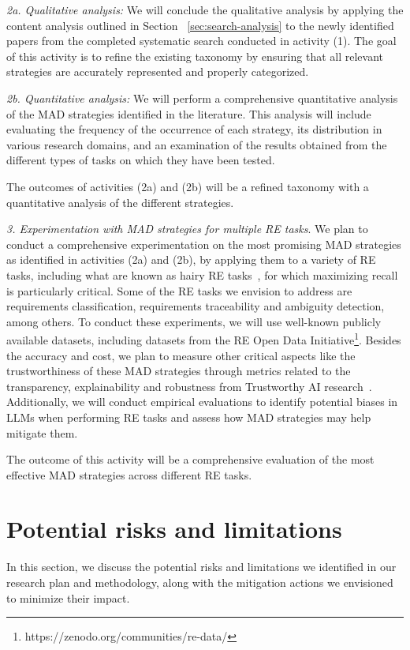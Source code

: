 \documentclass[conference]{IEEEtran}
\begin{document}
\textit{2a. Qualitative analysis: } We will conclude the qualitative analysis by applying the content analysis outlined in Section ~\ref{sec:search-analysis} to the newly identified papers from the completed systematic search conducted in activity (1). The goal of this activity is to refine the existing taxonomy by ensuring that all relevant strategies are accurately represented and properly categorized.

\textit{2b. Quantitative analysis: } We will perform a comprehensive quantitative analysis of the MAD strategies identified in the literature. This analysis will include evaluating the frequency of the occurrence of each strategy, its distribution in various research domains, and an examination of the results obtained from the different types of tasks on which they have been tested.

The outcomes of activities (2a) and (2b) will be a refined taxonomy with a quantitative analysis of the different strategies.

\textit{3. Experimentation with MAD strategies for multiple RE tasks}. We plan to conduct a comprehensive experimentation on the most promising MAD strategies as identified in activities (2a) and (2b), by applying them to a variety of RE tasks, including what are known as hairy RE tasks~\cite{Berry2021}, for which maximizing recall is particularly critical. Some of the RE tasks we envision to address are requirements classification, requirements traceability and ambiguity detection, among others. To conduct these experiments, we will use well-known publicly available datasets, including datasets from the RE Open Data Initiative\footnote{https://zenodo.org/communities/re-data/}.
Besides the accuracy and cost, we plan to measure other critical aspects like the trustworthiness of these MAD strategies through metrics related to the transparency, explainability and robustness from Trustworthy AI research~\cite{chander2025}. Additionally, we will conduct empirical evaluations to identify potential biases in LLMs when performing RE tasks and assess how MAD strategies may help mitigate them.  

The outcome of this activity will be a comprehensive evaluation of the most effective MAD strategies across different RE tasks. %

\section{Potential risks and limitations}
In this section, we discuss the potential risks and limitations we identified in our research plan and methodology, along with the mitigation actions we envisioned to minimize their impact.
\end{document}
